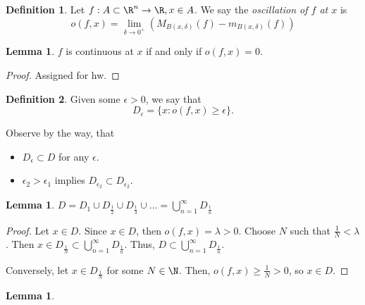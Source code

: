 \documentclass[a5paper]{article}
\theoremstyle{definition}%
\newtheorem{lemma}[theorem]{Lemma}
\newtheorem*{definition*}{Definition}
\numberwithin{exercise}{section}
\theoremstyle{remark}%
\begin{document}
\begin{highlight}
\begin{definition*}
Let $f:A\subset\R^n\to\R, x\in A$. We say the \emph{oscillation of $f$ at $x$} is 
$$o(f,x)=\lim_{\delta\to 0^+}\left(M_{B(x,\delta)}(f)-m_{B(x,\delta)}(f)\right)$$
\end{definition*}
\end{highlight}

\begin{highlight}
\begin{lemma}
$f$ is continuous at $x$ if and only if $o(f,x)=0$.
\end{lemma}
\end{highlight}
\begin{proof}
Assigned for hw.
\end{proof}

\begin{highlight}
\begin{definition*}
Given some $\epsilon>0$, we say that 
$$D_\epsilon = \{x:o(f,x)\geq\epsilon\}.$$
\end{definition*}
\end{highlight}
Observe by the way, that 
\begin{itemize}
\item $D_\epsilon \subset D$ for any $\epsilon$.
\item $\epsilon_2 > \epsilon_1$ implies $D_{\epsilon_2}\subset D_{\epsilon_2}$. 
\end{itemize}

\begin{highlight}
\begin{lemma}
$D=D_1\cup D_\frac{1}{2}\cup D_\frac{1}{3}\cup\dots = \bigcup\limits_{n=1}^\infty D_\frac{1}{n}$
\end{lemma}
\end{highlight}
\begin{proof}
Let $x\in D$. Since $x\in D$, then $o(f,x)=\lambda>0$. Choose $N$ such that $\frac{1}{N}<\lambda$. Then $x\in D_{\frac{1}{N}} \subset  \bigcup\limits_{n=1}^\infty D_\frac{1}{n}$. Thus, $D\subset \bigcup\limits_{n=1}^\infty D_\frac{1}{n}$. 

Conversely, let $x\in D_\frac{1}{N}$ for some $N\in\N$. Then, $o(f,x)\geq \frac{1}{N} >0$, so $x\in D$. 
\end{proof}

\begin{highlight}
\begin{lemma}

\end{lemma}
\end{highlight}
\end{document}

